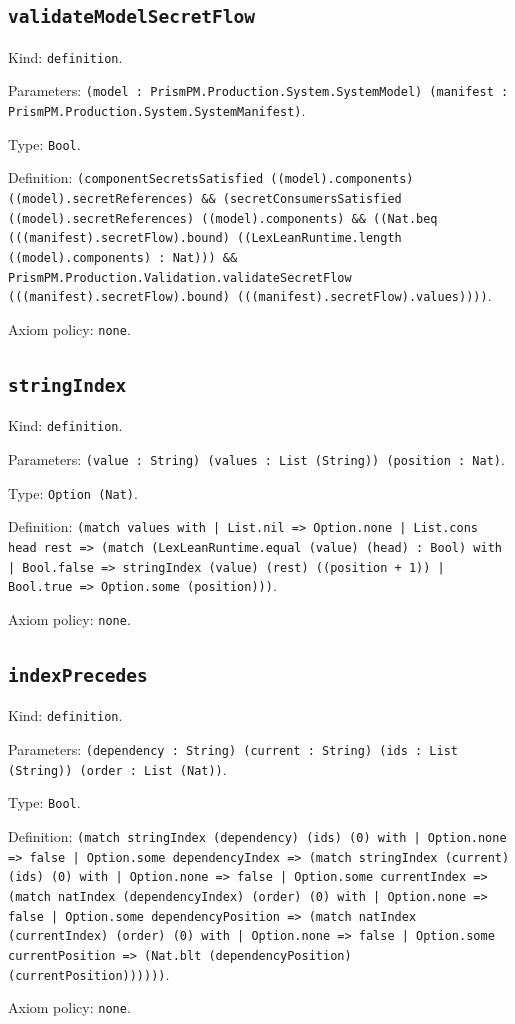 \documentclass[11pt]{article}
\begin{document}
\subsection*{\texttt{validateModelSecretFlow}}
\noindent Kind: \texttt{definition}.\par
\noindent Parameters: \texttt{(model : PrismPM.Production.System.SystemModel) (manifest : PrismPM.Production.System.SystemManifest)}.\par
\noindent Type: \texttt{Bool}.\par
\noindent Definition: \texttt{(componentSecretsSatisfied ((model).components) ((model).secretReferences) \&\& (secretConsumersSatisfied ((model).secretReferences) ((model).components) \&\& ((Nat.beq (((manifest).secretFlow).bound) ((LexLeanRuntime.length ((model).components) : Nat))) \&\& PrismPM.Production.Validation.validateSecretFlow (((manifest).secretFlow).bound) (((manifest).secretFlow).values))))}.\par
\noindent Axiom policy: \texttt{none}.\par
\subsection*{\texttt{stringIndex}}
\noindent Kind: \texttt{definition}.\par
\noindent Parameters: \texttt{(value : String) (values : List (String)) (position : Nat)}.\par
\noindent Type: \texttt{Option (Nat)}.\par
\noindent Definition: \texttt{(match values with | List.nil => Option.none | List.cons head rest => (match (LexLeanRuntime.equal (value) (head) : Bool) with | Bool.false => stringIndex (value) (rest) ((position + 1)) | Bool.true => Option.some (position)))}.\par
\noindent Axiom policy: \texttt{none}.\par
\subsection*{\texttt{indexPrecedes}}
\noindent Kind: \texttt{definition}.\par
\noindent Parameters: \texttt{(dependency : String) (current : String) (ids : List (String)) (order : List (Nat))}.\par
\noindent Type: \texttt{Bool}.\par
\noindent Definition: \texttt{(match stringIndex (dependency) (ids) (0) with | Option.none => false | Option.some dependencyIndex => (match stringIndex (current) (ids) (0) with | Option.none => false | Option.some currentIndex => (match natIndex (dependencyIndex) (order) (0) with | Option.none => false | Option.some dependencyPosition => (match natIndex (currentIndex) (order) (0) with | Option.none => false | Option.some currentPosition => (Nat.blt (dependencyPosition) (currentPosition))))))}.\par
\noindent Axiom policy: \texttt{none}.\par
\end{document}
